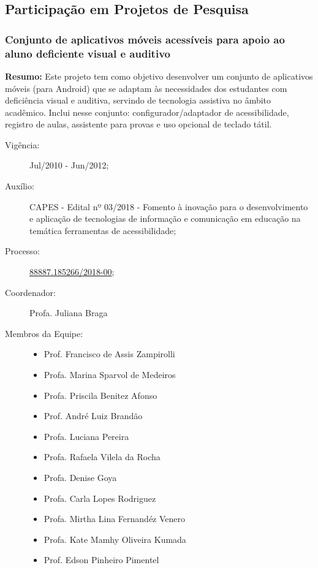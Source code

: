 \subsection{Participação em Projetos de Pesquisa}

\subsubsection{Conjunto de aplicativos móveis acessíveis para apoio ao aluno deficiente visual e auditivo}

\noindent\textbf{Resumo:} Este projeto tem como objetivo desenvolver um conjunto de aplicativos móveis (para Android) que se adaptam às necessidades dos estudantes com deficiência visual e auditiva, servindo de tecnologia assistiva no âmbito acadêmico. Inclui nesse conjunto: configurador/adaptador de acessibilidade, registro de aulas, assistente para provas e uso opcional de teclado tátil.

\begin{description}
    \item[Vigência:] Jul/2010 - Jun/2012;
    \item[Auxílio:] CAPES - Edital nº 03/2018 - Fomento à inovação para o desenvolvimento e aplicação de tecnologias de informação e comunicação em educação na temática ferramentas de acessibilidade;
    \item[Processo:] \href{https://www.gov.br/capes/pt-br/centrais-de-conteudo/24052018Edital32018Resultadofinal.pdf}{88887.185266/2018-00};
    \item[Coordenador:] Profa. Juliana Braga
    \item[Membros da Equipe:] \hfill 
    \begin{itemize}
        \item Prof. Francisco de Assis Zampirolli
        \item Profa. Marina Sparvol de Medeiros
        \item Profa. Priscila Benitez Afonso
        \item Prof. André Luiz Brandão
        \item Profa. Luciana Pereira
        \item Profa. Rafaela Vilela da Rocha
        \item Profa. Denise Goya
        \item Profa. Carla Lopes Rodriguez
        \item Profa. Mirtha Lina Fernandéz Venero
        \item Profa. Kate Mamhy Oliveira Kumada
        \item Prof. Edson Pinheiro Pimentel
    \end{itemize}
\end{description}

